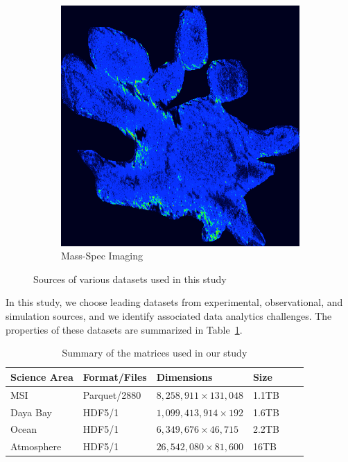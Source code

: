 \begin{figure}
\begin{subfigure}[b]{0.22\textwidth}
\includegraphics[width=\textwidth]{fig/mass-spec.png}
\caption{Mass-Spec Imaging}
\label{fig:mass-spec}
\end{subfigure}
\caption{Sources of various datasets used in this study}\label{fig:datasets}
\end{figure}
In this study, we choose leading datasets from experimental, observational, and simulation sources, and we identify associated data analytics challenges. 
The properties of these datasets are summarized in Table~\ref{table:datasets}.

\begin{table}[ht]
\centering
\caption{Summary of the matrices used in our study}
\label{table:datasets}
\begin{tabular}{p{2cm}lllll@{}}
\toprule
Science Area & Format/Files & Dimensions & Size  \\ \midrule
MSI      & Parquet/2880        &  $8,258,911 \times 131,048$          & 1.1TB  \\
Daya Bay & HDF5/1      &   $1,099,413,914 \times 192$         & 1.6TB \\
Ocean              & HDF5/1      &  $6,349,676 \times 46,715$          & 2.2TB \\
Atmosphere           & HDF5/1       & $26,542,080 \times 81,600$           & 16TB \\ \bottomrule
\end{tabular}
\end{table}



